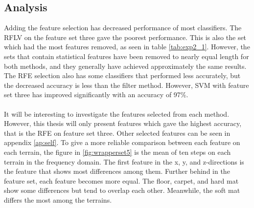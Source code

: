 \documentclass[USenglish]{ifimaster}  %
\begin{document}
\subsection{Analysis}
Adding the feature selection has decreased performance of most classifiers. The RFLV on the feature set three gave the poorest performance. This is also the set which had the most features removed, as seen in table \ref{tab:exp2_1}. However, the sets that contain statistical features have been removed to nearly equal length for both methods, and they generally have achieved approximately the same results. The RFE selection also has some classifiers that performed less accurately, but the decreased accuracy is less than the filter method. However, SVM with feature set three has improved significantly with an accuracy of 97\%.
\\
\\
It will be interesting to investigate the features selected from each method. However, this thesis will only present features which gave the highest accuracy, that is the RFE on feature set three. Other selected features can be seen in appendix \ref{ap:self}. To give a more reliable comparison between each feature on each terrain, the figure in \ref{fig:wrapperset5} is the mean of ten steps on each terrain in the frequency domain. The first feature in the x, y, and z-directions is the feature that shows most differences among them. Further behind in the feature set, each feature becomes more equal.  The floor, carpet, and hard mat show some differences but tend to overlap each other. Meanwhile, the soft mat differs the most among the terrains.
\end{document}
